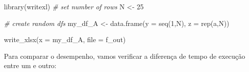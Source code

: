 \documentclass[
  11pt,
]{book}
\newenvironment{Shaded}{\begin{snugshade}}{\end{snugshade}}
\newcommand{\AttributeTok}[1]{\textcolor[rgb]{0.61,0.61,0.61}{#1}}
\newcommand{\CommentTok}[1]{\textcolor[rgb]{0.37,0.37,0.37}{\textit{#1}}}
\newcommand{\DecValTok}[1]{\textcolor[rgb]{0.06,0.06,0.06}{#1}}
\newcommand{\FunctionTok}[1]{\textcolor[rgb]{0,0,0}{#1}}
\newcommand{\NormalTok}[1]{#1}
\newcommand{\OtherTok}[1]{\textcolor[rgb]{0.37,0.37,0.37}{#1}}
\newcommand{\StringTok}[1]{\textcolor[rgb]{0.5,0.5,0.5}{#1}}
\begin{document}
\begin{Shaded}
\begin{Highlighting}[]
\FunctionTok{library}\NormalTok{(writexl)}
\CommentTok{\# set number of rows}
\NormalTok{N }\OtherTok{\textless{}{-}} \DecValTok{25}

\CommentTok{\# create random dfs}
\NormalTok{my\_df\_A }\OtherTok{\textless{}{-}} \FunctionTok{data.frame}\NormalTok{(}\AttributeTok{y =} \FunctionTok{seq}\NormalTok{(}\DecValTok{1}\NormalTok{,N),}
                      \AttributeTok{z =} \FunctionTok{rep}\NormalTok{(}\StringTok{\textquotesingle{}a\textquotesingle{}}\NormalTok{,N))}

\FunctionTok{write\_xlsx}\NormalTok{(}\AttributeTok{x =}\NormalTok{ my\_df\_A,}
           \AttributeTok{file =}\NormalTok{ f\_out)}
\end{Highlighting}
\end{Shaded}

Para comparar o desempenho, vamos verificar a diferença de tempo de execução entre um e outro:
\end{document}
